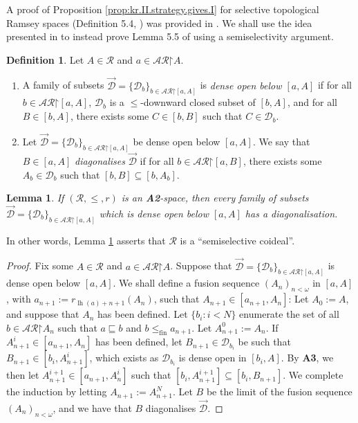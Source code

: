\documentclass[11pt,reqno]{amsart}
\theoremstyle{plain}
\numberwithin{equation}{section}
\newtheorem{lemma}[theorem]{Lemma}
\theoremstyle{definition}
\newtheorem{definition}[theorem]{Definition}
\newcommand{\func}{\operatorname}
\newcommand{\cal}{\mathcal}
\newcommand{\restrictedto}{\mathord{\upharpoonright}}
\newcommand{\lh}{\func{lh}}
\newcommand{\fin}{\mathrm{fin}}
\newcommand{\D}{\cal{D}}
\begin{document}
A proof of Proposition \ref{prop:kr.II.strategy.gives.I} for selective topological Ramsey spaces (Definition 5.4, \cite{CD23}) was provided in \cite{CD23}. We shall use the idea presented in \cite{DMU12} to instead prove Lemma 5.5 of \cite{CD23} using a semiselectivity argument. 

\begin{definition}
\label{def:semiselective}
    Let $A \in \cal{R}$ and $a \in \cal{AR}\restrictedto A$.
    \begin{enumerate}
        \item A family of subsets $\vec{\D} = \{\D_b\}_{b \in \cal{AR}\restrictedto[a,A]}$ is \emph{dense open below $[a,A]$} if for all $b \in \cal{AR}\restrictedto[a,A]$, $\D_b$ is a $\leq$-downward closed subset of $[b,A]$, and for all $B \in [b,A]$, there exists some $C \in [b,B]$ such that $C \in \D_b$.
        
        \item Let $\vec{\D} = \{\D_b\}_{b \in \cal{AR}\restrictedto[a,A]}$ be dense open below $[a,A]$. We say that $B \in [a,A]$ \emph{diagonalises} $\vec{\D}$ if for all $b \in \cal{AR}\restrictedto[a,B]$, there exists some $A_b \in \D_b$ such that $[b,B] \subseteq [b,A_b]$.
    \end{enumerate}
\end{definition}

\begin{lemma}
\label{lem:R.is.semiselective}
    If $(\cal{R},\leq,r)$ is an \textbf{A2}-space, then every family of subsets $\vec{\D} = \{\D_b\}_{b \in \cal{AR}\restrictedto[a,A]}$ which is dense open below $[a,A]$ has a diagonalisation.
\end{lemma}

In other words, Lemma \ref{lem:R.is.semiselective} asserts that $\cal{R}$ is a ``semiselective coideal''.

\begin{proof}
    Fix some $A \in \cal{R}$ and $a \in \cal{AR}\restrictedto A$. Suppose that $\vec{\D} = \{\D_b\}_{b \in \cal{AR}\restrictedto[a,A]}$ is dense open below $[a,A]$. We shall define a fusion sequence $(A_n)_{n<\omega}$ in $[a,A]$, with $a_{n+1} := r_{\lh(a)+n+1}(A_n)$, such that $A_{n+1} \in [a_{n+1},A_n]$: Let $A_0 := A$, and suppose that $A_n$ has been defined. Let $\{b_i : i < N\}$ enumerate the set of all $b \in \cal{AR}\restrictedto A_n$ such that $a \sqsubseteq b$ and $b \leq_\fin a_{n+1}$. Let $A_{n+1}^0 := A_n$. If $A_{n+1}^i \in [a_{n+1},A_n]$ has been defined, let $B_{n+1} \in \D_{b_i}$ be such that $B_{n+1} \in [b_i,A_{n+1}^i]$, which exists as $\D_{b_i}$ is dense open in $[b_i,A]$. By \textbf{A3}, we then let $A_{n+1}^{i+1} \in [a_{n+1},A_n^i]$ such that $[b_i,A_{n+1}^{i+1}] \subseteq [b_i,B_{n+1}]$. We complete the induction by letting $A_{n+1} := A_{n+1}^N$. Let $B$ be the limit of the fusion sequence $(A_n)_{n<\omega}$, and we have that $B$ diagonalises $\vec{\D}$. 
\end{proof}
\end{document}
